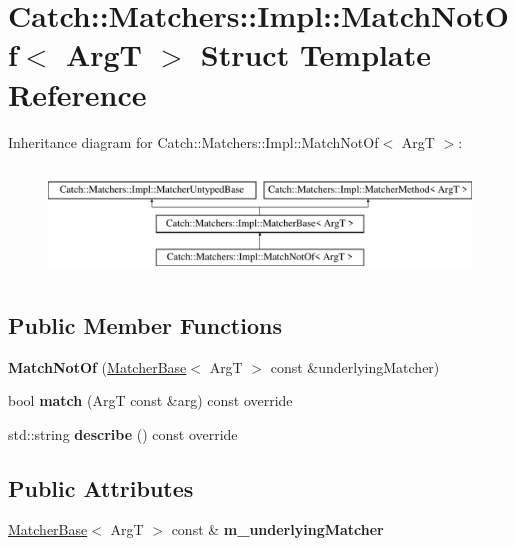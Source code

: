\hypertarget{struct_catch_1_1_matchers_1_1_impl_1_1_match_not_of}{}\section{Catch\+:\+:Matchers\+:\+:Impl\+:\+:Match\+Not\+Of$<$ ArgT $>$ Struct Template Reference}
\label{struct_catch_1_1_matchers_1_1_impl_1_1_match_not_of}
Inheritance diagram for Catch\+:\+:Matchers\+:\+:Impl\+:\+:Match\+Not\+Of$<$ ArgT $>$\+:\begin{figure}[H]
\begin{center}
\leavevmode
\includegraphics[height=2.926829cm]{struct_catch_1_1_matchers_1_1_impl_1_1_match_not_of}
\end{center}
\end{figure}
\subsection*{Public Member Functions}
\begin{DoxyCompactItemize}
\item 
\mbox{\label{struct_catch_1_1_matchers_1_1_impl_1_1_match_not_of_a47afdd9e4c3354cef85adc3186097ae4}} 
{\bfseries Match\+Not\+Of} (\mbox{\hyperlink{struct_catch_1_1_matchers_1_1_impl_1_1_matcher_base}{Matcher\+Base}}$<$ ArgT $>$ const \&underlying\+Matcher)
\item 
\mbox{\label{struct_catch_1_1_matchers_1_1_impl_1_1_match_not_of_a181d693c0258e582d80dc6117a1f2b66}} 
bool {\bfseries match} (ArgT const \&arg) const override
\item 
\mbox{\label{struct_catch_1_1_matchers_1_1_impl_1_1_match_not_of_ac5fb4ef6a9069d23a4098c3c818f06b0}} 
std\+::string {\bfseries describe} () const override
\end{DoxyCompactItemize}
\subsection*{Public Attributes}
\begin{DoxyCompactItemize}
\item 
\mbox{\label{struct_catch_1_1_matchers_1_1_impl_1_1_match_not_of_af7ac67f112b0e93796b048a47329aad4}} 
\mbox{\hyperlink{struct_catch_1_1_matchers_1_1_impl_1_1_matcher_base}{Matcher\+Base}}$<$ ArgT $>$ const  \& {\bfseries m\+\_\+underlying\+Matcher}
\end{DoxyCompactItemize}
